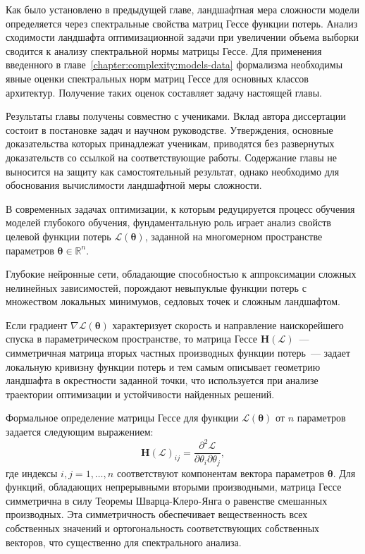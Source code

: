 Как было установлено в предыдущей главе, ландшафтная мера сложности модели определяется через спектральные свойства матриц Гессе функции потерь. Анализ сходимости ландшафта оптимизационной задачи при увеличении объема выборки сводится к анализу спектральной нормы матрицы Гессе. Для применения введенного в главе~\ref{chapter:complexity:models-data} формализма необходимы явные оценки спектральных норм матриц Гессе для основных классов архитектур. Получение таких оценок составляет задачу настоящей главы.

Результаты главы получены совместно с учениками. Вклад автора диссертации состоит в постановке задач и научном руководстве. Утверждения, основные доказательства которых принадлежат ученикам, приводятся без развернутых доказательств со ссылкой на соответствующие работы. Содержание главы не выносится на защиту как самостоятельный результат, однако необходимо для обоснования вычислимости ландшафтной меры сложности.

В современных задачах оптимизации, к которым редуцируется процесс обучения моделей глубокого обучения, фундаментальную роль играет анализ свойств целевой функции потерь $\mathcal{L}(\boldsymbol{\theta})$, заданной на многомерном пространстве параметров $\boldsymbol{\theta} \in \mathbb{R}^n$.

Глубокие нейронные сети, обладающие способностью к аппроксимации сложных нелинейных зависимостей, порождают невыпуклые функции потерь с множеством локальных минимумов, седловых точек и сложным ландшафтом.

Если градиент $\nabla \mathcal{L}(\boldsymbol{\theta})$ характеризует скорость и направление наискорейшего спуска в параметрическом пространстве, то матрица Гессе $\mathbf{H}(\mathcal{L})$~--- симметричная матрица вторых частных производных функции потерь~--- задает локальную кривизну функции потерь и тем самым описывает геометрию ландшафта в окрестности заданной точки, что используется при анализе траектории оптимизации и устойчивости найденных решений.

Формальное определение матрицы Гессе для функции $\mathcal{L}(\boldsymbol{\theta})$ от $n$ параметров задается следующим выражением:
\[
    \mathbf{H}(\mathcal{L})_{ij} = \frac{\partial^2 \mathcal{L}}{\partial \theta_i \partial \theta_j},
\]
где индексы $i, j = 1, \dots, n$ соответствуют компонентам вектора параметров $\boldsymbol{\theta}$.
Для функций, обладающих непрерывными вторыми производными, матрица Гессе симметрична в силу Теоремы Шварца-Клеро-Янга о равенстве смешанных производных.
Эта симметричность обеспечивает вещественность всех собственных значений и ортогональность соответствующих собственных векторов, что существенно для спектрального анализа.

